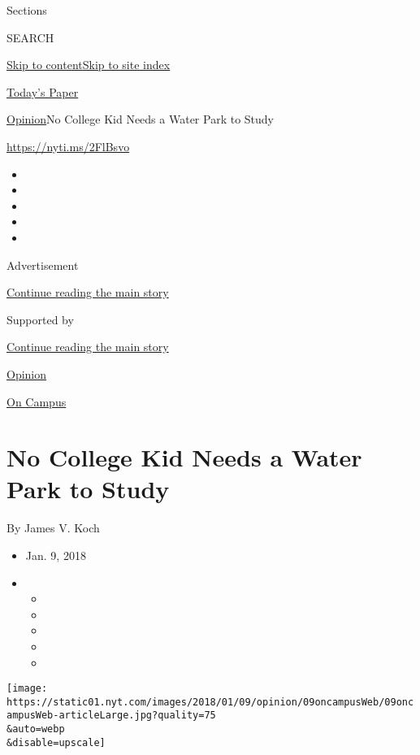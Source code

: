 Sections

SEARCH

\protect\hyperlink{site-content}{Skip to
content}\protect\hyperlink{site-index}{Skip to site index}

\href{https://myaccount.nytimes.com/auth/login?response_type=cookie\&client_id=vi}{}

\href{https://www.nytimes.com/section/todayspaper}{Today's Paper}

\href{/section/opinion}{Opinion}\textbar{}No College Kid Needs a Water
Park to Study

\href{https://nyti.ms/2FlBsvo}{https://nyti.ms/2FlBsvo}

\begin{itemize}
\item
\item
\item
\item
\item
\end{itemize}

Advertisement

\protect\hyperlink{after-top}{Continue reading the main story}

Supported by

\protect\hyperlink{after-sponsor}{Continue reading the main story}

\href{/section/opinion}{Opinion}

\href{/column/on-campus}{On Campus}

\hypertarget{no-college-kid-needs-a-water-park-to-study}{%
\section{No College Kid Needs a Water Park to
Study}\label{no-college-kid-needs-a-water-park-to-study}}

By James V. Koch

\begin{itemize}
\item
  Jan. 9, 2018
\item
  \begin{itemize}
  \item
  \item
  \item
  \item
  \item
  \end{itemize}
\end{itemize}

\texttt{[image: https://static01.nyt.com/images/2018/01/09/opinion/09oncampusWeb/09oncampusWeb-articleLarge.jpg?quality=75\\\&auto=webp\\\&disable=upscale]}

